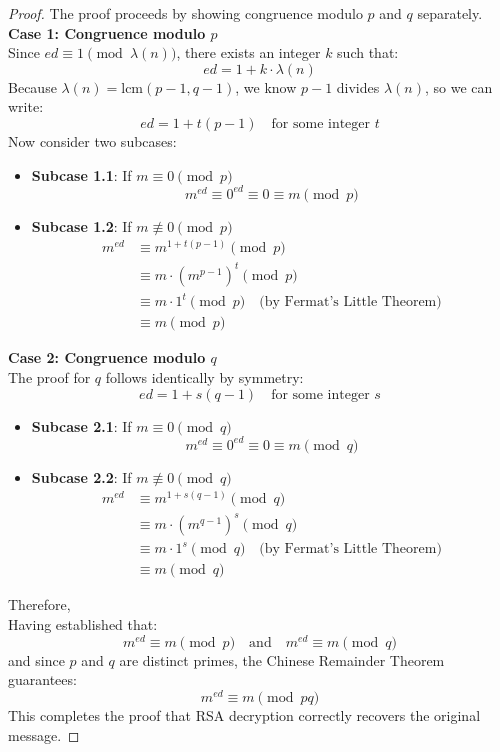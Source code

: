\documentclass[11pt,a4paper]{article}
\numberwithin{equation}{section}
\begin{document}
\begin{proof}
The proof proceeds by showing congruence modulo $p$ and $q$ separately. \\
\noindent \textbf{Case 1: Congruence modulo $p$} \\
Since $ed \equiv 1 \pmod{\lambda(n)}$, there exists an integer $k$ such that:
\[ed = 1 + k\cdot\lambda(n)\]
Because $\lambda(n) = \text{lcm}(p-1,q-1)$, we know $p-1$ divides $\lambda(n)$, so we can write:
\[ed = 1 + t(p-1) \quad \text{for some integer } t\]
Now consider two subcases:
\begin{itemize}
\item \textbf{Subcase 1.1}: If $m \equiv 0 \pmod{p}$
\[ m^{ed} \equiv 0^{ed} \equiv 0 \equiv m \pmod{p} \]
\item \textbf{Subcase 1.2}: If $m \not\equiv 0 \pmod{p}$
\begin{align*}
m^{ed} &\equiv m^{1 + t(p-1)} \pmod{p} \\
&\equiv m \cdot (m^{p-1})^t \pmod{p} \\
&\equiv m \cdot 1^t \pmod{p} \quad \text{(by Fermat's Little Theorem)} \\
&\equiv m \pmod{p}
\end{align*}
\end{itemize}
\noindent \textbf{Case 2: Congruence modulo $q$} \\
The proof for $q$ follows identically by symmetry:
\[ed = 1 + s(q-1) \quad \text{for some integer } s \]
\begin{itemize}
\item \textbf{Subcase 2.1}: If $m \equiv 0 \pmod{q}$
\[m^{ed} \equiv 0^{ed} \equiv 0 \equiv m \pmod{q}\]
\item \textbf{Subcase 2.2}: If $m \not\equiv 0 \pmod{q}$
\begin{align*}
m^{ed} &\equiv m^{1 + s(q-1)} \pmod{q} \\
&\equiv m \cdot (m^{q-1})^s \pmod{q} \\
&\equiv m \cdot 1^s \pmod{q} \quad \text{(by Fermat's Little Theorem)} \\
&\equiv m \pmod{q}
\end{align*}
\end{itemize}
Therefore, \\
Having established that:
\[
m^{ed} \equiv m \pmod{p} \quad \text{and} \quad m^{ed} \equiv m \pmod{q}
\]
and since $p$ and $q$ are distinct primes, the Chinese Remainder Theorem guarantees:
\[ m^{ed} \equiv m \pmod{pq} \]
This completes the proof that RSA decryption correctly recovers the original message.
\end{proof}
\end{document}
